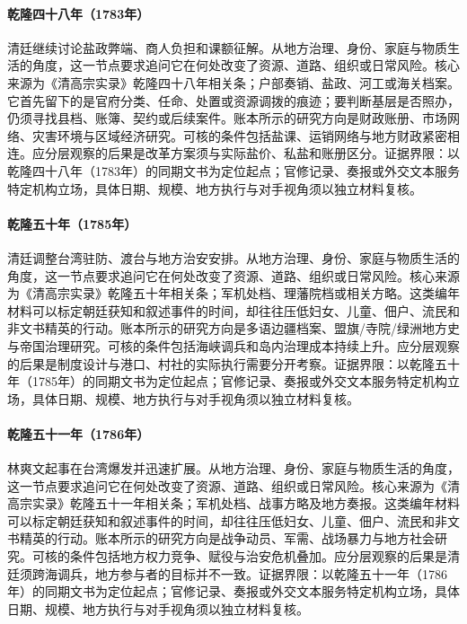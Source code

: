\hypertarget{social:EQ-1783-SALT-MONOPOLY-REVIEW}{}\paragraph{乾隆四十八年（1783年）}清廷继续讨论盐政弊端、商人负担和课额征解。从地方治理、身份、家庭与物质生活的角度，这一节点要求追问它在何处改变了资源、道路、组织或日常风险。核心来源为《清高宗实录》乾隆四十八年相关条；户部奏销、盐政、河工或海关档案。它首先留下的是官府分类、任命、处置或资源调拨的痕迹；要判断基层是否照办，仍须寻找县档、账簿、契约或后续案件。账本所示的研究方向是财政账册、市场网络、灾害环境与区域经济研究。可核的条件包括盐课、运销网络与地方财政紧密相连。应分层观察的后果是改革方案须与实际盐价、私盐和账册区分。证据界限：以乾隆四十八年（1783年）的同期文书为定位起点；官修记录、奏报或外交文本服务特定机构立场，具体日期、规模、地方执行与对手视角须以独立材料复核。
\hypertarget{social:EQ-1785-TAIWAN-GARRISON}{}\paragraph{乾隆五十年（1785年）}清廷调整台湾驻防、渡台与地方治安安排。从地方治理、身份、家庭与物质生活的角度，这一节点要求追问它在何处改变了资源、道路、组织或日常风险。核心来源为《清高宗实录》乾隆五十年相关条；军机处档、理藩院档或相关方略。这类编年材料可以标定朝廷获知和叙述事件的时间，却往往压低妇女、儿童、佃户、流民和非文书精英的行动。账本所示的研究方向是多语边疆档案、盟旗/寺院/绿洲地方史与帝国治理研究。可核的条件包括海峡调兵和岛内治理成本持续上升。应分层观察的后果是制度设计与港口、村社的实际执行需要分开考察。证据界限：以乾隆五十年（1785年）的同期文书为定位起点；官修记录、奏报或外交文本服务特定机构立场，具体日期、规模、地方执行与对手视角须以独立材料复核。
\hypertarget{social:EQ-1786-LIN-SHUANGWEN-UPRISING}{}\paragraph{乾隆五十一年（1786年）}林爽文起事在台湾爆发并迅速扩展。从地方治理、身份、家庭与物质生活的角度，这一节点要求追问它在何处改变了资源、道路、组织或日常风险。核心来源为《清高宗实录》乾隆五十一年相关条；军机处档、战事方略及地方奏报。这类编年材料可以标定朝廷获知和叙述事件的时间，却往往压低妇女、儿童、佃户、流民和非文书精英的行动。账本所示的研究方向是战争动员、军需、战场暴力与地方社会研究。可核的条件包括地方权力竞争、赋役与治安危机叠加。应分层观察的后果是清廷须跨海调兵，地方参与者的目标并不一致。证据界限：以乾隆五十一年（1786年）的同期文书为定位起点；官修记录、奏报或外交文本服务特定机构立场，具体日期、规模、地方执行与对手视角须以独立材料复核。
